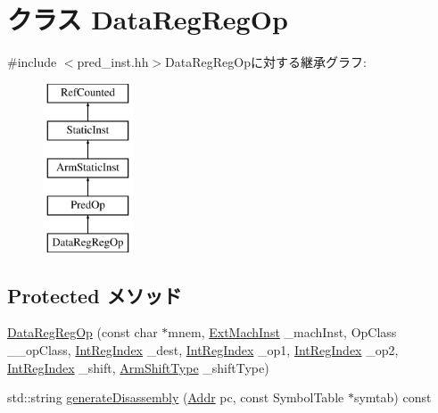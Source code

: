 \hypertarget{classArmISA_1_1DataRegRegOp}{
\section{クラス DataRegRegOp}
\label{classArmISA_1_1DataRegRegOp}
}


{\ttfamily \#include $<$pred\_\-inst.hh$>$}DataRegRegOpに対する継承グラフ:\begin{figure}[H]
\begin{center}
\leavevmode
\includegraphics[height=5cm]{classArmISA_1_1DataRegRegOp}
\end{center}
\end{figure}
\subsection*{Protected メソッド}
\begin{DoxyCompactItemize}
\item 
\hyperlink{classArmISA_1_1DataRegRegOp_a7b339ab2ed74e1021bc2e7ae51ec4b46}{DataRegRegOp} (const char $\ast$mnem, \hyperlink{classStaticInst_a5605d4fc727eae9e595325c90c0ec108}{ExtMachInst} \_\-machInst, OpClass \_\-\_\-opClass, \hyperlink{namespaceArmISA_ae64680ba9fb526106829d6bf92fc791b}{IntRegIndex} \_\-dest, \hyperlink{namespaceArmISA_ae64680ba9fb526106829d6bf92fc791b}{IntRegIndex} \_\-op1, \hyperlink{namespaceArmISA_ae64680ba9fb526106829d6bf92fc791b}{IntRegIndex} \_\-op2, \hyperlink{namespaceArmISA_ae64680ba9fb526106829d6bf92fc791b}{IntRegIndex} \_\-shift, \hyperlink{namespaceArmISA_a209d79feaaef0aa2f54ae62e53ee90de}{ArmShiftType} \_\-shiftType)
\item 
std::string \hyperlink{classArmISA_1_1DataRegRegOp_a95d323a22a5f07e14d6b4c9385a91896}{generateDisassembly} (\hyperlink{classm5_1_1params_1_1Addr}{Addr} pc, const SymbolTable $\ast$symtab) const 
\end{DoxyCompactItemize}
